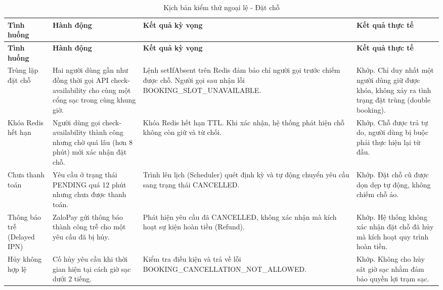 \begin{center}
    \renewcommand{\arraystretch}{1.5}
    \begin{longtable}{|>{\raggedright\arraybackslash}m{}|>{\raggedright\arraybackslash}m{}|>{\raggedright\arraybackslash}m{}|>{\raggedright\arraybackslash}m{}|}
        \caption{Kịch bản kiểm thử ngoại lệ - Đặt chỗ}
        \label{tab:booking_negative} \\
        \hline
        \textbf{Tình huống} & \textbf{Hành động} & \textbf{Kết quả kỳ vọng} & \textbf{Kết quả thực tế} \\
        \hline
        \endfirsthead
        
        \hline
        \textbf{Tình huống} & \textbf{Hành động} & \textbf{Kết quả kỳ vọng} & \textbf{Kết quả thực tế} \\
        \hline
        \endhead
        
        Trùng lặp đặt chỗ & Hai người dùng gần như đồng thời gọi API check-availability cho cùng một cổng sạc trong cùng khung giờ. & Lệnh setIfAbsent trên Redis đảm bảo chỉ người gọi trước chiếm được chỗ. Người gọi sau nhận lỗi BOOKING\_\allowbreak SLOT\_\allowbreak UNAVAILABLE. & Khớp. Chỉ duy nhất một người dùng giữ được khóa, không xảy ra tình trạng đặt trùng (double booking). \\
        \hline
        Khóa Redis hết hạn & Người dùng gọi check-availability thành công nhưng chờ quá lâu (hơn 8 phút) mới xác nhận đặt chỗ. & Khóa Redis hết hạn TTL. Khi xác nhận, hệ thống phát hiện chỗ không còn giữ và từ chối. & Khớp. Chỗ được trả tự do, người dùng bị buộc phải thực hiện lại từ đầu. \\
        \hline
        Chưa thanh toán & Yêu cầu ở trạng thái PENDING quá 12 phút nhưng chưa được thanh toán. & Trình lên lịch (Scheduler) quét định kỳ và tự động chuyển yêu cầu sang trạng thái CANCELLED. & Khớp. Đặt chỗ cũ được dọn dẹp tự động, không chiếm chỗ ảo. \\
        \hline
        Thông báo trễ (Delayed IPN) & ZaloPay gửi thông báo thành công trễ cho một yêu cầu đã bị hủy. & Phát hiện yêu cầu đã CANCELLED, không xác nhận mà kích hoạt sự kiện hoàn tiền (Refund). & Khớp. Hệ thống không xác nhận đặt chỗ đã hủy mà kích hoạt quy trình hoàn tiền. \\
        \hline
        Hủy không hợp lệ & Cố hủy yêu cầu khi thời gian hiện tại cách giờ sạc dưới 2 tiếng. & Kiểm tra điều kiện và trả về lỗi BOOKING\_\allowbreak CANCELLATION\_\allowbreak NOT\_\allowbreak ALLOWED. & Khớp. Không cho hủy sát giờ sạc nhằm đảm bảo quyền lợi trạm sạc. \\
        \hline
    \end{longtable}
\end{center}

